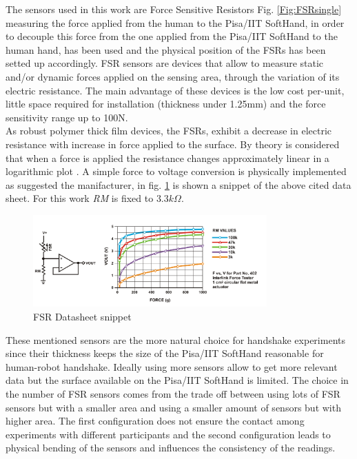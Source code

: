 The sensors used in this work are Force Sensitive Resistors Fig. \ref{Fig:FSRsingle} measuring the force applied from the human to the Pisa/IIT SoftHand, in order to decouple this force from the one applied from the Pisa/IIT SoftHand to the human hand, \cite{knoop2017handshakiness} has been used and the physical position of the FSRs has been setted up accordingly.
FSR sensors are devices that allow to measure static and/or dynamic forces applied on the sensing area, through the variation of its electric resistance. The main advantage of these devices is the low cost per-unit, little space required for installation (thickness under 1.25mm) and the force sensitivity range up to 100N.\\
As robust polymer thick film devices, the FSRs, exhibit a decrease in electric resistance with increase in force applied to the surface. By theory is considered that when a force is applied the resistance changes approximately linear in a logarithmic plot \cite{fsrdatasheet}.
A simple force to voltage conversion is physically implemented as suggested the manifacturer, in fig. \ref{Fig:FSRcircuit} is shown a snippet of the above cited data sheet. For this work \textit{RM} is fixed to $3.3 k \Omega $. \\
\begin{figure}[ht]
\centering
\includegraphics[width=0.8\textwidth]{Figure/fsr.png}
\caption{FSR Datasheet snippet}
\label{Fig:FSRcircuit}
\end{figure}
These mentioned sensors are the more natural choice for handshake experiments since their thickness keeps the size of the Pisa/IIT SoftHand reasonable for human-robot handshake.
% 
Ideally using more sensors allow to get more relevant data but the surface available on the Pisa/IIT SoftHand is limited. The choice in the number of FSR sensors comes from the trade off between using lots of FSR sensors but with a smaller area and using a smaller amount of sensors but with higher area. The first configuration does not ensure the contact among experiments with different participants and the second configuration leads to physical bending of the sensors and influences the consistency of the readings.

